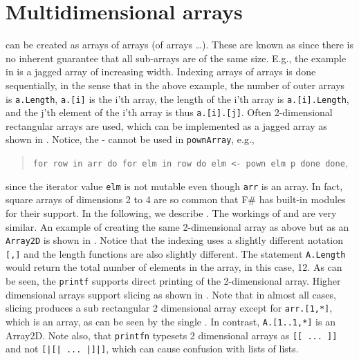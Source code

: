 \section{Multidimensional arrays}
 can be created as arrays of arrays (of arrays \dots). These are known as  since there is no inherent guarantee that all sub-arrays are of the same size. E.g., the example in  is a jagged array of increasing width.
%
%
Indexing arrays of arrays is done sequentially, in the sense that in the above example, the number of outer arrays is \lstinline|a.Length|,  \lstinline|a.[i]| is the i'th array, the length of the i'th array is \lstinline|a.[i].Length|, and the j'th element of the i'th array is thus \lstinline|a.[i].[j]|. Often 2-dimensional rectangular arrays are used, which can be implemented as a jagged array as shown in .
%
%
Notice, the - cannot be used in \lstinline!pownArray!, e.g., 
\begin{quote} 
  \mbox{\lstinline{for row in arr do for elm in row do elm <- pown elm p done done}},
 \end{quote}
since the iterator value \lstinline!elm! is not mutable even though \lstinline!arr! is an array.
%
In fact, square arrays of dimensions 2 to 4 are so common that F\# has built-in modules for their support. In the following, we describe . The workings of  and  are very similar. An example of creating the same 2-dimensional array as above but as an \lstinline{Array2D} is shown in .
%
%
Notice that the indexing uses a slightly different notation \lstinline|[,]| and the length functions are also slightly different. The statement \lstinline|A.Length| would return the total number of elements in the array, in this case, 12. As can be seen, the \lstinline!printf! supports direct printing of the 2-dimensional array. Higher dimensional arrays support slicing as shown in .
%
%
Note that in almost all cases, slicing produces a sub rectangular 2 dimensional array except for \lstinline{arr.[1,*]}, which is an array, as can be seen by the single \lexeme{[}. In contrast, \lstinline{A.[1..1,*]} is an Array2D. Note also, that \lstinline!printfn! typesets 2 dimensional arrays as \lstinline{[[ ... ]]} and not \lstinline{[|[| ... |]|]}, which can cause confusion with lists of lists.


